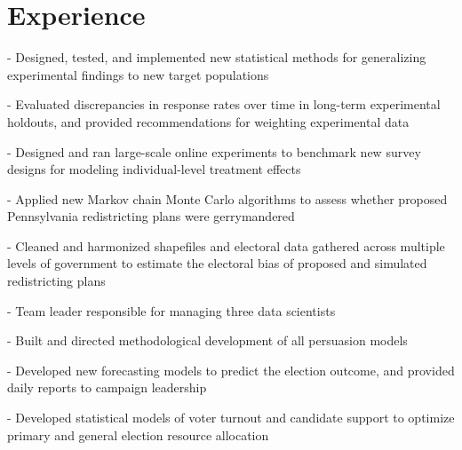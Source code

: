 \documentclass[]{deedy-resume-openfont}
\begin{document}
\begin{minipage}[t]{0.66\textwidth} 


\section{Experience}

\vspace{\topsep} %
\begin{tightemize}
\item[-] Designed, tested, and implemented new statistical methods for generalizing experimental findings to new target populations
\item[-] Evaluated discrepancies in response rates over time in long-term experimental holdouts, and provided recommendations for weighting experimental data 
\item[-] Designed and ran large-scale online experiments to benchmark new survey designs for modeling individual-level treatment effects
\end{tightemize}
\sectionsep

\begin{tightemize}
\item[-] Applied new Markov chain Monte Carlo algorithms to assess whether proposed Pennsylvania redistricting plans were gerrymandered
\item[-] Cleaned and harmonized shapefiles and electoral data gathered across multiple levels of government to estimate the electoral bias of proposed and simulated redistricting plans
\end{tightemize}
\sectionsep

\begin{tightemize}
\item[-] Team leader responsible for managing three data scientists
\item[-] Built and directed methodological development of all persuasion models
\item[-] Developed new forecasting models to predict the election outcome, and provided daily reports to campaign leadership
\item[-] Developed statistical models of voter turnout and candidate support to optimize primary and general election resource allocation
\end{tightemize}


\end{minipage}
\end{document}
